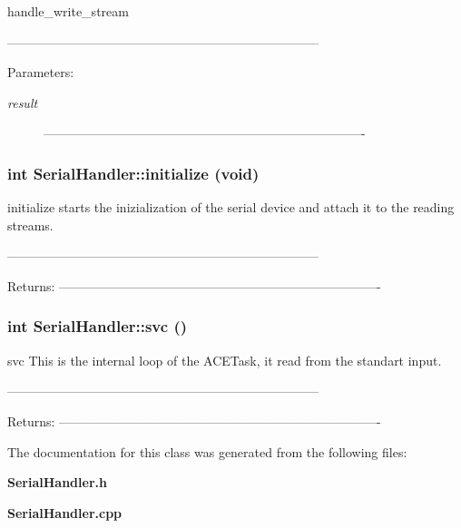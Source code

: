 handle\_\-write\_\-stream 

-------------------------------------------------------------------------- 

\begin{Desc}
\item[Parameters:]
\begin{description}
\item[{\em result}]---------------------------------------------------------------------------- \end{description}
\end{Desc}
\subsubsection{\setlength{\rightskip}{0pt plus 5cm}int Serial\-Handler::initialize (void)}\label{classSerialHandler_a2}


initialize starts the inizialization of the serial device and attach it to the reading streams. 

-------------------------------------------------------------------------- 

\begin{Desc}
\item[Returns:]---------------------------------------------------------------------------- \end{Desc}
\subsubsection{\setlength{\rightskip}{0pt plus 5cm}int Serial\-Handler::svc ()\hspace{0.3cm}{\tt  [virtual]}}\label{classSerialHandler_a3}


svc This is the internal loop of the ACETask, it read from the standart input. 

-------------------------------------------------------------------------- 

\begin{Desc}
\item[Returns:]---------------------------------------------------------------------------- \end{Desc}


The documentation for this class was generated from the following files:\begin{CompactItemize}
\item 
{\bf Serial\-Handler.h}\item 
{\bf Serial\-Handler.cpp}\end{CompactItemize}
